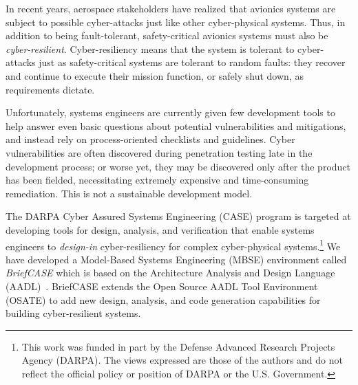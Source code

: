 In recent years, aerospace stakeholders have realized that avionics systems are subject to possible cyber-attacks just like other cyber-physical systems.  Thus, in addition to being fault-tolerant, safety-critical avionics systems must also be {\em cyber-resilient}. Cyber-resiliency means that the system is tolerant to cyber-attacks just as safety-critical systems are tolerant to random faults: they recover and continue to execute their mission function, or safely shut down, as requirements dictate.

Unfortunately, systems engineers are currently given few development tools to help answer even basic questions about potential vulnerabilities and mitigations, and instead rely on process-oriented checklists and guidelines.  Cyber vulnerabilities are often discovered during penetration testing late in the development process; or worse yet, they may be discovered only after the product has been fielded, necessitating extremely expensive and time-consuming remediation. This is not a sustainable development model.

The DARPA Cyber Assured Systems Engineering (CASE) program is targeted at developing tools for design, analysis, and verification that enable systems engineers to {\em design-in} cyber-resiliency for complex cyber-physical systems.\footnote{This work was funded in part by the Defense Advanced Research Projects Agency (DARPA).  The views expressed are those of the authors and do not reflect the official policy or position of DARPA or the U.S. Government.}
We have developed a Model-Based Systems Engineering (MBSE) environment called {\em BriefCASE} which is based on the Architecture Analysis and Design Language (AADL)~\cite{aadl}.  BriefCASE extends the Open Source AADL Tool Environment (OSATE) to add new design, analysis, and code generation capabilities for building cyber-resilient systems.

